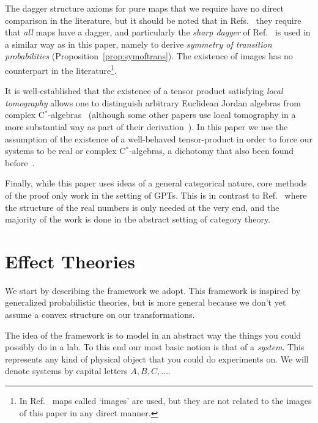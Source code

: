 \documentclass[a4paper,onecolumn,10pt,accepted=2019-05-03, issue=1, volume=1, shorttitle=papers/compositionality-1-1]{compositionalityarticle}
\newcounter{counter}
\numberwithin{counter}{section}
\begin{document}
The dagger structure axioms for pure maps that we require have no direct comparison in the literature, but it should be noted that in Refs.~\cite{tull2016reconstruction,selby2018reconstructing} they require that \emph{all} maps have a dagger, and particularly the \emph{sharp dagger} of Ref.~\cite{selby2018reconstructing} is used in a similar way as in this paper, namely to derive \emph{symmetry of transition probabilities} (Proposition~\ref{prop:symoftrans}). The existence of images has no counterpart in the literature\footnote{In Ref.~\cite{tull2016reconstruction} maps called `images' are used, but they are not related to the images of this paper in any direct manner.}.

It is well-established that the existence of a tensor product satisfying \emph{local tomography} allows one to distinguish arbitrary Euclidean Jordan algebras from complex C$^*$-algebras~\cite{tull2016reconstruction,selby2018reconstructing,hohn2017toolbox,wilce2018royal,wetering2018sequential} (although some other papers use local tomography in a more substantial way as part of their derivation~\cite{hardy2001quantum,chiribella2011informational}). In this paper we use the assumption of the existence of a well-behaved tensor-product in order to force our systems to be real or complex C$^*$-algebras, a dichotomy that also been found before~\cite{hanche1985jb,barnum2016composites}.

Finally, while this paper uses ideas of a general categorical nature, core methods of the proof only work in the setting of GPTs. This is in contrast to Ref.~\cite{tull2016reconstruction} where the structure of the real numbers is only needed at the very end, and the majority of the work is done in the abstract setting of category theory.



\section{Effect Theories}\label{sec:framework}
We start by describing the framework we adopt. This framework is inspired by generalized probabilistic theories, but is more general because we don't yet assume a convex structure on our transformations.

The idea of the framework is to model in an abstract way the things you could possibly do in a lab. To this end our most basic notion is that of a \emph{system}. This represents any kind of physical object that you could do experiments on. We will denote systems by capital letters $A,B,C,\ldots$.
\end{document}
